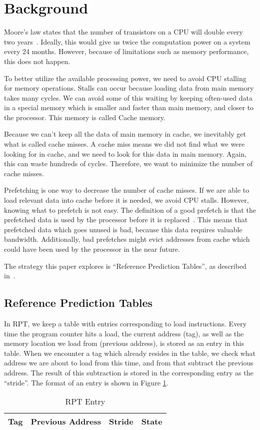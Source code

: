 \section{Background} %


Moore's law states that the number of transistors on a CPU will double
every two years~\cite{moore}. Ideally, this would give us twice the
computation power on a system every 24 months. However, because of
limitations such as memory performance, this does not happen.

To better utilize the available processing power, we need to avoid CPU
stalling for memory operations. Stalls can occur because loading data
from main memory takes many cycles. We can avoid some of this waiting
by keeping often-used data in a special memory which is smaller and
faster than main memory, and closer to the processor. This memory is
called Cache memory.

Because we can't keep all the data of main memory in cache, we
inevitably get what is called cache misses. A cache miss means we did
not find what we were looking for in cache, and we need to look for
this data in main memory. Again, this can waste hundreds of
cycles. Therefore, we want to minimize the number of cache misses.

Prefetching is one way to decrease the number of cache misses. If we
are able to load relevant data into cache before it is needed, we
avoid CPU stalls. However, knowing what to prefetch is not easy. The
definition of a good prefetch is that the prefetched data is used by
the processor before it is
replaced~\cite{srinivasan_davidson_tyson_2004}. This means that
prefetched data which goes unused is bad, because this data requires
valuable bandwidth. Additionally, bad prefetches might evict addresses
from cache which could have been used by the processor in the near
future.

The strategy this paper explores is ``Reference Prediction Tables'', as
described in~\cite{chen_baer_1995}.

\subsection{Reference Prediction Tables}
In RPT, we keep a table with entries corresponding to load
instructions. Every time the program counter hits a load, the current
address (tag), as well as the memory location we load from
(previous address), is stored as an entry in this table. When we encounter a
tag which already resides in the table, we check what address we are
about to load from this time, and from that subtract the previous
address. The result of this subtraction is stored in the corresponding
entry as the ``stride''. The format of an entry is shown in Figure
\ref{table:entry}.

\begin{table}
  \centering
  \begin{tabular}{ | c | c | c | c |}
    \hline
    Tag & Previous Address & Stride & State \\ \hline
  \end{tabular}
  \caption{RPT Entry}
  \label{table:entry}
\end{table}

